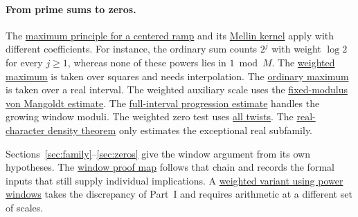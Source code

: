 \documentclass[11pt,a4paper]{article}
\begin{document}
\paragraph{From prime sums to zeros.}
The \hyperlink{proof.centered-ramp-maximum}{maximum principle for a
centered ramp} and its \hyperlink{proof.mellin-ramp-kernel}{Mellin kernel}
apply with different coefficients. For instance, the ordinary sum
counts \(2^j\) with weight \(\log 2\) for every \(j\ge1\), whereas none
of these powers lies in \(1\bmod M\). The
\hyperlink{proof.weighted-square-selection}{weighted maximum} is taken
over squares and needs interpolation. The
\hyperlink{proof.classical-window-test-scale}{ordinary maximum} is
taken over a real interval. The weighted auxiliary scale uses the
\hyperlink{proof.fixed-modulus-pnt}{fixed-modulus von Mangoldt estimate}.
The \hyperlink{proof.full-interval-prime-progressions}{full-interval
progression estimate} handles the growing window moduli. The weighted zero test
uses \hyperlink{proof.weighted-twist-exceptions}{all twists}. The \hyperlink{proof.real-character-zero-density}{real-character
density theorem} only estimates the exceptional real subfamily.

Sections~\ref{sec:family}--\ref{sec:zeros} give the window argument
from its own hypotheses. The \href{proof-map.html\#window}{window
proof map} follows that chain and records the formal inputs that still
supply individual implications. A \hyperlink{proof.weighted-window-variant}{weighted
variant using power windows} takes the discrepancy of Part~I and
requires arithmetic at a different set of scales.
\end{document}
